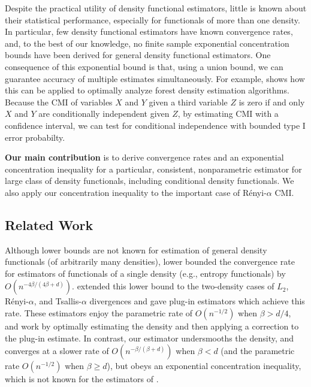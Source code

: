 \documentclass{article} %
\begin{document}
Despite the practical utility of density functional estimators, little is known
about their statistical performance, especially for functionals of more than
one density. In particular, few density functional estimators have known
convergence rates, and, to the best of our knowledge, no finite sample
exponential concentration bounds have been derived for general density
functional estimators. One consequence of this exponential bound is that, using
a union bound, we can guarantee accuracy of multiple estimates
simultaneously. For example, \citep{liu12exponential} shows how this can be
applied to optimally analyze forest density estimation algorithms. Because the
CMI of variables $X$ and $Y$ given a third variable $Z$ is zero if and only $X$
and $Y$ are conditionally independent given $Z$, by estimating CMI with a
confidence interval, we can test for conditional independence with bounded type
I error probabilty.

{\bf Our main contribution} is to derive convergence rates and an exponential
concentration inequality for a particular, consistent, nonparametric estimator
for large class of density functionals, including conditional density
functionals. We also apply our concentration inequality to the important case
of R\'enyi-$\alpha$ CMI.

\subsection{Related Work}
Although lower bounds are not known for estimation of general density
functionals (of arbitrarily many densities), \citep{birge95estimation} lower
bounded the convergence rate for estimators of functionals of a single density
(e.g., entropy functionals) by $O\left( n^{-4\beta/(4\beta + d)} \right)$.
\citep{krishnamurthy14divergences} extended
this lower bound to the two-density cases of $L_2$, R\'enyi-$\alpha$, and
Tsallis-$\alpha$ divergences and gave plug-in estimators which achieve this
rate. These estimators enjoy the parametric rate of $O\left( n^{-1/2} \right)$
when $\beta > d/4$, and work by optimally estimating the density and then
applying a correction to the plug-in estimate. In contrast, our estimator
undersmooths the density, and converges at a slower rate of
$O\left( n^{-\beta/(\beta + d)} \right)$ when $\beta < d$ (and the parametric
rate $O\left( n^{-1/2} \right)$ when $\beta \geq d$), but obeys an exponential
concentration inequality, which is not known for the estimators of
\citep{krishnamurthy14divergences}.
\end{document}
